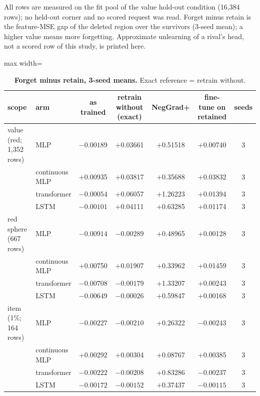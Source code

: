 \documentclass{article} %
\begin{document}
All rows are measured on the fit pool of the value hold-out condition (16,384 rows); no held-out corner %
and no scored request was read. Forget minus retain is the feature-MSE gap of the deleted region
over the survivors (3-seed mean); a higher value means more forgetting. Approximate unlearning of a
rival's head, not a scored row of this study, is printed here.

\begin{table}[h]
\centering\small
\caption{\textbf{Forget minus retain, 3-seed means.} Exact reference = retrain without.}
\label{tab:unlearn}
\setlength{\tabcolsep}{3pt}
\begin{adjustbox}{max width=\linewidth}\begin{tabular}{llccccc}
\toprule
scope & arm & as trained & retrain without (exact) & NegGrad+ & fine-tune on retained & seeds \\
\midrule
value (red; 1,352 rows) & MLP & $-0.00189$ & +0.03661 & +0.51518 & +0.00740 & 3 \\
 & continuous MLP & +0.00935 & +0.03817 & +0.35688 & +0.03832 & 3 \\
 & transformer & $-0.00054$ & +0.06057 & +1.26223 & +0.01394 & 3 \\
 & LSTM & $-0.00101$ & +0.04111 & +0.63285 & +0.01174 & 3 \\
red sphere (667 rows) & MLP & $-0.00914$ & $-0.00289$ & +0.48965 & +0.00128 & 3 \\
 & continuous MLP & +0.00750 & +0.01907 & +0.33962 & +0.01459 & 3 \\
 & transformer & $-0.00708$ & $-0.00179$ & +1.33207 & +0.00243 & 3 \\
 & LSTM & $-0.00649$ & $-0.00026$ & +0.59847 & +0.00168 & 3 \\
item (1\%; 164 rows) & MLP & $-0.00227$ & $-0.00210$ & +0.26322 & $-0.00243$ & 3 \\
 & continuous MLP & +0.00292 & +0.00304 & +0.08767 & +0.00385 & 3 \\
 & transformer & $-0.00222$ & $-0.00208$ & +0.83286 & $-0.00237$ & 3 \\
 & LSTM & $-0.00172$ & $-0.00152$ & +0.37437 & $-0.00115$ & 3 \\
\bottomrule
\end{tabular}\end{adjustbox}
\end{table}
\end{document}
